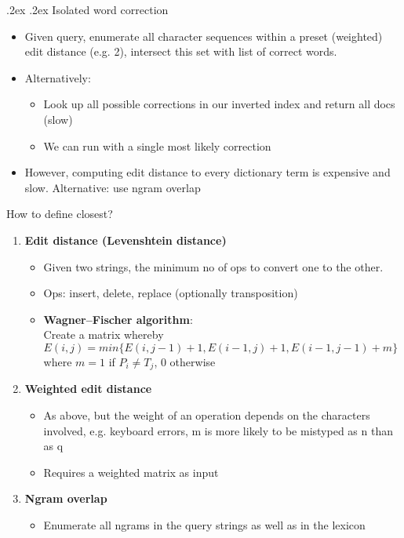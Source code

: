 \documentclass[10pt,landscape,a4paper]{article}
\makeatletter
\renewcommand{\subsubsection}{\@startsection{subsubsection}{1}{0mm}%
  {.2ex}%
  {.2ex}%
{\rmfamily\bfseries}}
\makeatother
\begin{document}
\begin{multicols*}{3}
  \subsubsection{Isolated word correction}
  \begin{itemize}
    \item Given query, enumerate all character sequences within a preset (weighted) edit distance (e.g. 2), intersect this set with list of correct words.
    \item Alternatively:
    \begin{itemize}
      \item Look up all possible corrections in our inverted index and return all docs (slow)
      \item We can run with a single most likely correction
    \end{itemize}
    \item However, computing edit distance to every dictionary term is expensive and slow. Alternative: use ngram overlap
  \end{itemize}
  How to define closest?
  \begin{enumerate}
    \item \textbf{Edit distance (Levenshtein distance)}
    \begin{itemize}
      \item Given two strings, the minimum no of ops to convert one to the other.
      \item Ops: insert, delete, replace (optionally transposition)
      \item \textbf{Wagner–Fischer algorithm}:\\
      Create a matrix whereby $E(i, j) = min \{ E(i, j - 1) + 1, E(i - 1, j) + 1, E(i - 1, j - 1) + m \}$ where $m = 1$ if $P_i \neq T_j$, $0$ otherwise
    \end{itemize}
    \item \textbf{Weighted edit distance}
    \begin{itemize}
      \item As above, but the weight of an operation depends on the characters involved, e.g. keyboard errors, m is more likely to be mistyped as n than as q
      \item Requires a weighted matrix as input
    \end{itemize}
    \item \textbf{Ngram overlap}
    \begin{itemize}
      \item Enumerate all ngrams in the query strings as well as in the lexicon

\end{itemize}
\end{enumerate}
\end{multicols*}
\end{document}
